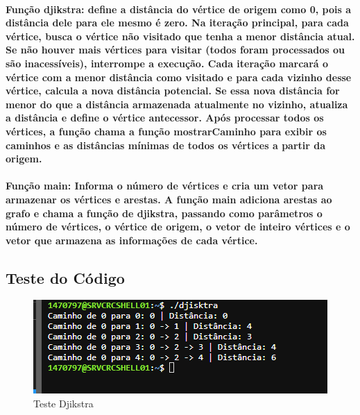 \documentclass{article}
\begin{document}
\paragraph{Função djikstra: define a distância do vértice de origem como 0, pois a distância dele para ele mesmo é zero. Na iteração principal, para cada vértice, busca o vértice não visitado que tenha a menor distância atual. Se não houver mais vértices para visitar (todos foram processados ou são inacessíveis), interrompe a execução. Cada iteração marcará o vértice com a menor distância como visitado e para cada vizinho desse vértice, calcula a nova distância potencial. Se essa nova distância for menor do que a distância armazenada atualmente no vizinho, atualiza a distância e define o vértice antecessor. Após processar todos os vértices, a função chama a função mostrarCaminho para exibir os caminhos e as distâncias mínimas de todos os vértices a partir da origem.}

\paragraph{Função main: Informa o número de vértices e cria um vetor para armazenar os vértices e arestas. A função main adiciona arestas ao grafo e chama a função de djikstra, passando como parâmetros o número de vértices, o vértice de origem, o vetor de inteiro vértices e o vetor que armazena as informações de cada vértice.}

\subsection{ Teste do Código }

\begin{figure}[h]
    \centering
    \includegraphics[width=1\textwidth]{imgs/djikstra.PNG}
    \caption{Teste Djikstra}
    \label{fig:corr}
\end{figure}
\
\end{document}
